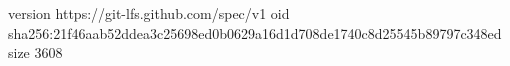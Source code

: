 version https://git-lfs.github.com/spec/v1
oid sha256:21f46aab52ddea3c25698ed0b0629a16d1d708de1740c8d25545b89797c348ed
size 3608
